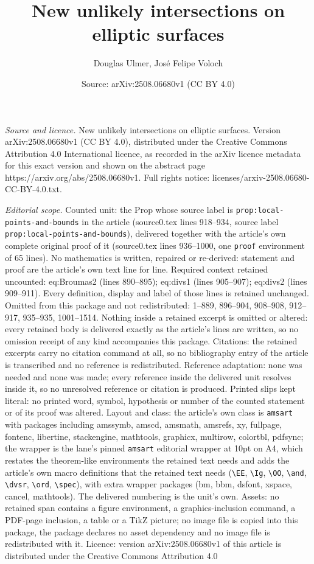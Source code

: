 \documentclass[10pt,a4paper]{amsart}
\title[New unlikely intersections on elliptic surfaces]{New unlikely intersections on elliptic surfaces}
\author{Douglas Ulmer, Jos\'e Felipe Voloch}
\date{Source: arXiv:2508.06680v1 (CC BY 4.0)}
\begin{document}
\maketitle

\noindent\emph{Source and licence.} New unlikely intersections on elliptic surfaces. Version arXiv:2508.06680v1 (CC BY 4.0), distributed under the Creative Commons Attribution 4.0 International licence, as recorded in the arXiv licence metadata for this exact version and shown on the abstract page https://arxiv.org/abs/2508.06680v1. Full rights notice: licenses/arxiv-2508.06680-CC-BY-4.0.txt.\par\smallskip

\noindent\textit{Editorial scope.} Counted unit: the Prop whose source label is \texttt{prop:local-points-and-bounds} in the article (source0.tex lines 918--934, source label \texttt{prop:local-points-and-bounds}), delivered together with the article's own complete original proof of it (source0.tex lines 936--1000, one \texttt{proof} environment of 65 lines). No mathematics is written, repaired or re-derived: statement and proof are the article's own text line for line. Required context retained uncounted: eq:Broumas2 (lines 890--895); eq:divs1 (lines 905--907); eq:divs2 (lines 909--911). Every definition, display and label of those lines is retained unchanged. Omitted from this package and not redistributed: 1--889, 896--904, 908--908, 912--917, 935--935, 1001--1514. Nothing inside a retained excerpt is omitted or altered: every retained body is delivered exactly as the article's lines are written, so no omission receipt of any kind accompanies this package. Citations: the retained excerpts carry no citation command at all, so no bibliography entry of the article is transcribed and no reference is redistributed. Reference adaptation: none was needed and none was made; every reference inside the delivered unit resolves inside it, so no unresolved reference or citation is produced. Printed slips kept literal: no printed word, symbol, hypothesis or number of the counted statement or of its proof was altered. Layout and class: the article's own class is \texttt{amsart} with packages including amssymb, amscd, amsmath, amsrefs, xy, fullpage, fontenc, libertine, stackengine, mathtools, graphicx, multirow, colortbl, pdfsync; the wrapper is the lane's pinned \texttt{amsart} editorial wrapper at 10pt on A4, which restates the theorem-like environments the retained text needs and adds the article's own macro definitions that the retained text needs (\texttt{\textbackslash EE}, \texttt{\textbackslash Ig}, \texttt{\textbackslash OO}, \texttt{\textbackslash and}, \texttt{\textbackslash dvsr}, \texttt{\textbackslash ord}, \texttt{\textbackslash spec}), with extra wrapper packages (bm, bbm, dsfont, xspace, cancel, mathtools). The delivered numbering is the unit's own. Assets: no retained span contains a figure environment, a graphics-inclusion command, a PDF-page inclusion, a table or a TikZ picture; no image file is copied into this package, the package declares no asset dependency and no image file is redistributed with it. Licence: version arXiv:2508.06680v1 of this article is distributed under the Creative Commons Attribution 4.0 
\end{document}
